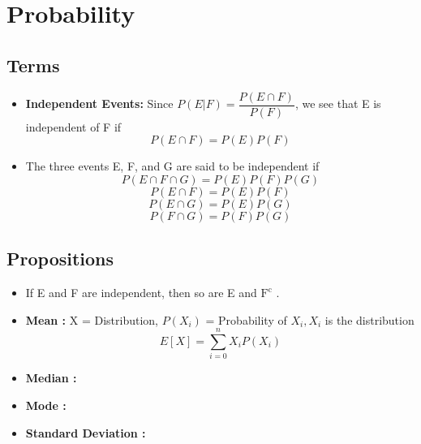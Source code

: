 \documentclass[a4paper,oneside]{book}
\begin{document}
\chapter{Probability}
\section{Terms}
\begin{itemize}
\item \textbf{Independent Events:} Since $P(E|F) = \dfrac{P(E \cap F )}{P(F)}$, we see that E is independent of F if
$$ P(E \cap F) = P(E)P(F) $$
\item The three events E, F, and G are said to be independent if
$$P(E \cap F \cap G) = P(E)P(F)P(G)$$
$$P(E \cap F) = P(E)P(F)$$
$$P(E \cap G) = P(E)P(G)$$
$$P(F \cap G) = P(F)P(G) $$
\end{itemize}
\section{Propositions}
\begin{itemize}
\item If E and F are independent, then so are E and $\text{F}^{\text{c}}$ .
\item \textbf{Mean :} X = Distribution, $P(X_i)$ = Probability of $X_i, X_i$ is the distribution  $$E\left[X\right] = \sum_{i = 0}^{n}   X_{i}P(X_{i})$$
\item \textbf{Median :}
\item \textbf{Mode :}
\item \textbf{Standard Deviation :}
\end{itemize}
\end{document}
